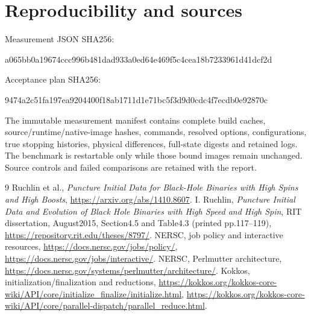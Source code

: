 \documentclass[11pt]{article}
\begin{document}
\section{Reproducibility and sources}
Measurement JSON SHA256:\par{\footnotesize\ttfamily a065bb0a19674ccc996b481dad933a0ed64e469f5c4cea18b7233961d41dcf2d}\par
Acceptance plan SHA256:\par{\footnotesize\ttfamily 9474a2c51fa197ea9204400f18ab1711d1e71bc5f3d9d0cdc4f7ecdb0e92870c}\par
The immutable measurement manifest contains complete build caches,
source/runtime/native-image hashes, commands, resolved options, configurations,
true stopping histories, physical differences, full-state digests and retained
logs. The benchmark is restartable only while those bound images remain
unchanged. Source controls and failed comparisons are retained with the report.

\begin{thebibliography}{9}
 Ruchlin et al., \emph{Puncture Initial Data for Black-Hole
Binaries with High Spins and High Boosts}, \url{https://arxiv.org/abs/1410.8607}.
 I. Ruchlin, \emph{Puncture Initial Data and Evolution of
Black Hole Binaries with High Speed and High Spin}, RIT dissertation,
August2015, Section4.5 and Table4.3 (printed pp.117--119),
\url{https://repository.rit.edu/theses/8797/}.
 NERSC, job policy and interactive resources,
\url{https://docs.nersc.gov/jobs/policy/},
\url{https://docs.nersc.gov/jobs/interactive/}.
 NERSC, Perlmutter architecture,
\url{https://docs.nersc.gov/systems/perlmutter/architecture/}.
 Kokkos, initialization/finalization and reductions,
\url{https://kokkos.org/kokkos-core-wiki/API/core/initialize_finalize/initialize.html},
\url{https://kokkos.org/kokkos-core-wiki/API/core/parallel-dispatch/parallel_reduce.html}.
\end{thebibliography}
\end{document}
